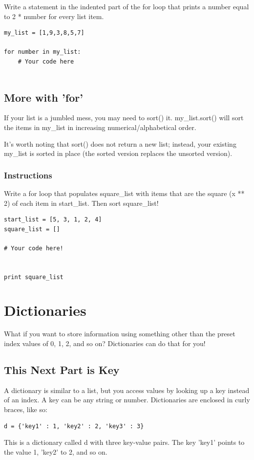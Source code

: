 \documentclass[12pt,a4paper,final,twoside,onecolumn,titlepage]{book}
\begin{document}
Write a statement in the indented part of the for loop that prints a number equal to 2 * number for every list item.

\begin{lstlisting}
my_list = [1,9,3,8,5,7]

for number in my_list:
    # Your code here
    
\end{lstlisting}

\subsection{More with 'for'}

If your list is a jumbled mess, you may need to sort() it. my\_list.sort() will sort the items in my\_list in increasing numerical/alphabetical order.

It's worth noting that sort() does not return a new list; instead, your existing my\_list is sorted in place (the sorted version replaces the unsorted version).
\subsubsection{Instructions}

Write a for loop that populates square\_list with items that are the square (x ** 2) of each item in start\_list. Then sort square\_list!

\begin{lstlisting}
start_list = [5, 3, 1, 2, 4]
square_list = []

# Your code here!


print square_list
\end{lstlisting}

\section{Dictionaries}
What if you want to store information using something other than the preset index values of 0, 1, 2, and so on? Dictionaries can do that for you!

\subsection{This Next Part is Key}

A dictionary is similar to a list, but you access values by looking up a key instead of an index. A key can be any string or number. Dictionaries are enclosed in curly braces, like so:
\begin{lstlisting}
d = {'key1' : 1, 'key2' : 2, 'key3' : 3}
\end{lstlisting}
This is a dictionary called d with three key-value pairs. The key 'key1' points to the value 1, 'key2' to 2, and so on.
\end{document}
